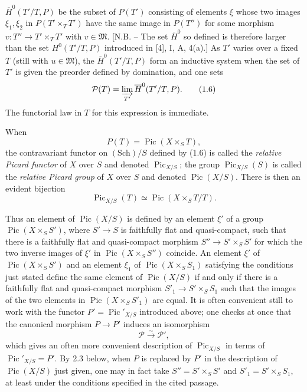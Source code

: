 $\overline H^0(T'/T,P)$ be the subset of $P(T')$ consisting of elements $\xi$
whose two images $\xi_1,\xi_2$ in $P(T'\times_TT')$ have the same image in
$P(T'')$ for some morphism $v:T''\longrightarrow T'\times_TT'$ with
$v\in\mathfrak M$. [N.B. -- The set $\overline H^0$ so defined is therefore
larger than the set $H^0(T'/T,P)$ introduced in [4], I, A, 4(a).] As $T'$ varies
over a fixed $T$ (still with $u\in\mathfrak M$), the
$\overline H^0(T'/T,P)$ form an inductive system when the set of $T'$ is given
the preorder defined by domination, and one sets
\begin{equation}
\mathcal P(T)=\varinjlim_{T'}\overline H^0(T'/T,P).
\tag{1.6}
\end{equation}
The functorial law in $T$ for this expression is immediate.

When
\[
P(T)=\operatorname{Pic}(X\times_ST),
\]
the contravariant functor on $(\mathrm{Sch})/S$ defined by (1.6) is called the
\emph{relative Picard functor} of $X$ over $S$ and denoted
$\operatorname{Pic}_{X/S}$; the group $\operatorname{Pic}_{X/S}(S)$ is called
the \emph{relative Picard group} of $X$ over $S$ and denoted
$\operatorname{Pic}(X/S)$. There is then an evident bijection
\begin{equation}
\operatorname{Pic}_{X/S}(T)\simeq\operatorname{Pic}(X\times_ST/T).
\tag{1.7}
\end{equation}

Thus an element of $\operatorname{Pic}(X/S)$ is defined by an element $\xi'$ of
a group $\operatorname{Pic}(X\times_SS')$, where $S'\longrightarrow S$ is
faithfully flat and quasi-compact, such that there is a faithfully flat and
quasi-compact morphism $S''\longrightarrow S'\times_SS'$ for which the two
inverse images of $\xi'$ in $\operatorname{Pic}(X\times_SS'')$ coincide. An
element $\xi'$ of $\operatorname{Pic}(X\times_SS')$ and an element $\xi_1$ of
$\operatorname{Pic}(X\times_SS_1)$ satisfying the conditions just stated
define the same element of $\operatorname{Pic}(X/S)$ if and only if there is a
faithfully flat and quasi-compact morphism
$S'_1\longrightarrow S'\times_SS_1$ such that the images of the two elements
in $\operatorname{Pic}(X\times_SS'_1)$ are equal. It is often convenient still
to work with the functor $P'=\operatorname{Pic}'_{X/S}$ introduced above; one
checks at once that the canonical morphism $P\longrightarrow P'$ induces an
isomorphism
\begin{equation}
\mathcal P\xrightarrow{\sim}\mathcal P',
\tag{1.8}
\end{equation}
which gives an often more convenient description of
$\operatorname{Pic}_{X/S}$ in terms of $\operatorname{Pic}'_{X/S}=P'$. By 2.3
below, when $P$ is replaced by $P'$ in the description of
$\operatorname{Pic}(X/S)$ just given, one may in fact
take $S''=S'\times_SS'$ and $S'_1=S'\times_SS_1$, at least under the conditions
specified in the cited passage.

